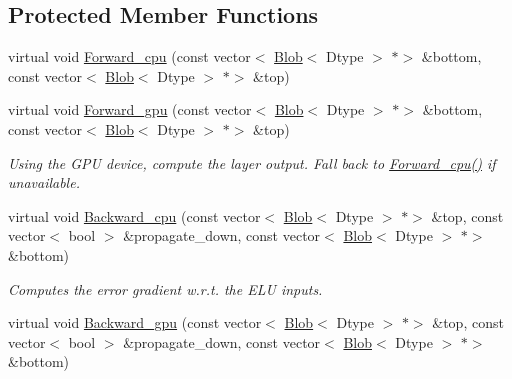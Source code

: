 \subsection*{Protected Member Functions}
\begin{DoxyCompactItemize}
\item 
virtual void \mbox{\hyperlink{classcaffe_1_1_e_l_u_layer_a041f6109649dfb97dff80c0d6364c20d}{Forward\+\_\+cpu}} (const vector$<$ \mbox{\hyperlink{classcaffe_1_1_blob}{Blob}}$<$ Dtype $>$ $\ast$$>$ \&bottom, const vector$<$ \mbox{\hyperlink{classcaffe_1_1_blob}{Blob}}$<$ Dtype $>$ $\ast$$>$ \&top)
\item 
\mbox{\label{classcaffe_1_1_e_l_u_layer_adf358202203d0735dff3275d6f668a00}} 
virtual void \mbox{\hyperlink{classcaffe_1_1_e_l_u_layer_adf358202203d0735dff3275d6f668a00}{Forward\+\_\+gpu}} (const vector$<$ \mbox{\hyperlink{classcaffe_1_1_blob}{Blob}}$<$ Dtype $>$ $\ast$$>$ \&bottom, const vector$<$ \mbox{\hyperlink{classcaffe_1_1_blob}{Blob}}$<$ Dtype $>$ $\ast$$>$ \&top)
\begin{DoxyCompactList}\small\item\em Using the G\+PU device, compute the layer output. Fall back to \mbox{\hyperlink{classcaffe_1_1_e_l_u_layer_a041f6109649dfb97dff80c0d6364c20d}{Forward\+\_\+cpu()}} if unavailable. \end{DoxyCompactList}\item 
virtual void \mbox{\hyperlink{classcaffe_1_1_e_l_u_layer_a606284cd2e5ff40154ff0865a100b940}{Backward\+\_\+cpu}} (const vector$<$ \mbox{\hyperlink{classcaffe_1_1_blob}{Blob}}$<$ Dtype $>$ $\ast$$>$ \&top, const vector$<$ bool $>$ \&propagate\+\_\+down, const vector$<$ \mbox{\hyperlink{classcaffe_1_1_blob}{Blob}}$<$ Dtype $>$ $\ast$$>$ \&bottom)
\begin{DoxyCompactList}\small\item\em Computes the error gradient w.\+r.\+t. the E\+LU inputs. \end{DoxyCompactList}\item 
\mbox{\label{classcaffe_1_1_e_l_u_layer_a0dc9a42bb095c77df19118da60198a1e}} 
virtual void \mbox{\hyperlink{classcaffe_1_1_e_l_u_layer_a0dc9a42bb095c77df19118da60198a1e}{Backward\+\_\+gpu}} (const vector$<$ \mbox{\hyperlink{classcaffe_1_1_blob}{Blob}}$<$ Dtype $>$ $\ast$$>$ \&top, const vector$<$ bool $>$ \&propagate\+\_\+down, const vector$<$ \mbox{\hyperlink{classcaffe_1_1_blob}{Blob}}$<$ Dtype $>$ $\ast$$>$ \&bottom)

\end{DoxyCompactItemize}
